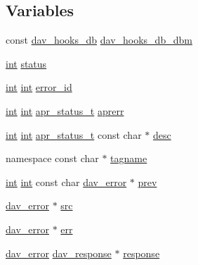 \subsection*{Variables}
\begin{DoxyCompactItemize}
\item 
const \hyperlink{group__MOD__DAV_gafb40434fe70df3d6b814d00757680507}{dav\+\_\+hooks\+\_\+db} \hyperlink{group__MOD__DAV_ga1bfcaf2d006fd752eca3dc211b22647b}{dav\+\_\+hooks\+\_\+db\+\_\+dbm}
\item 
\hyperlink{pcre_8txt_a42dfa4ff673c82d8efe7144098fbc198}{int} \hyperlink{group__MOD__DAV_ga6e27f49150e9a14580fb313cc2777e00}{status}
\item 
\hyperlink{pcre_8txt_a42dfa4ff673c82d8efe7144098fbc198}{int} \hyperlink{pcre_8txt_a42dfa4ff673c82d8efe7144098fbc198}{int} \hyperlink{group__MOD__DAV_ga5e2420d462bed5cf0127a1ebe06ca4d1}{error\+\_\+id}
\item 
\hyperlink{pcre_8txt_a42dfa4ff673c82d8efe7144098fbc198}{int} \hyperlink{pcre_8txt_a42dfa4ff673c82d8efe7144098fbc198}{int} \hyperlink{group__apr__errno_gaa5105fa83cc322f09382292db8b47593}{apr\+\_\+status\+\_\+t} \hyperlink{group__MOD__DAV_gad6ab505736bdeb22c744ff1560e6504a}{aprerr}
\item 
\hyperlink{pcre_8txt_a42dfa4ff673c82d8efe7144098fbc198}{int} \hyperlink{pcre_8txt_a42dfa4ff673c82d8efe7144098fbc198}{int} \hyperlink{group__apr__errno_gaa5105fa83cc322f09382292db8b47593}{apr\+\_\+status\+\_\+t} const char $\ast$ \hyperlink{group__MOD__DAV_ga21c7b5d68e8da2320aba56644b2a5447}{desc}
\item 
namespace const char $\ast$ \hyperlink{group__MOD__DAV_gad88f0e2b448f8637fffbb0e4fc4fec45}{tagname}
\item 
\hyperlink{pcre_8txt_a42dfa4ff673c82d8efe7144098fbc198}{int} \hyperlink{pcre_8txt_a42dfa4ff673c82d8efe7144098fbc198}{int} const char \hyperlink{structdav__error}{dav\+\_\+error} $\ast$ \hyperlink{group__MOD__DAV_gacc5462e7a268b365a64468a6cf83b727}{prev}
\item 
\hyperlink{structdav__error}{dav\+\_\+error} $\ast$ \hyperlink{group__MOD__DAV_gac04f87655105455048cb4f5f7af79fe2}{src}
\item 
\hyperlink{structdav__error}{dav\+\_\+error} $\ast$ \hyperlink{group__MOD__DAV_gae58fd63a27d8e9a2accfa334571b45c0}{err}
\item 
\hyperlink{structdav__error}{dav\+\_\+error} \hyperlink{structdav__response}{dav\+\_\+response} $\ast$ \hyperlink{group__MOD__DAV_ga61a23706db0e2c726e15a7a081345de7}{response}
\item 

\end{DoxyCompactItemize}
